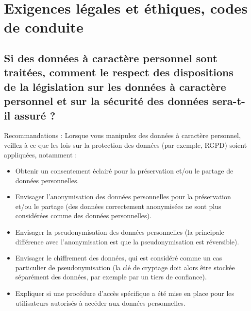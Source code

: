 \documentclass{article}
\begin{document}
\section{Exigences légales et éthiques, codes de conduite}
\subsection{Si des données à caractère personnel sont traitées, comment le respect des dispositions de la législation sur les données à caractère personnel et sur la sécurité des données sera-t-il assuré ?}
Recommandations :
\newline Lorsque vous manipulez des données à caractère personnel, veillez à ce que les lois sur la protection des données (par exemple, RGPD) soient appliquées, notamment :
\begin{itemize}
    \item Obtenir un consentement éclairé pour la préservation et/ou le partage de données personnelles.
    \item Envisager l'anonymisation des données personnelles pour la préservation et/ou le partage (des données correctement anonymisées ne sont plus considérées comme des données personnelles).
    \item Envisager la pseudonymisation des données personnelles (la principale différence avec l'anonymisation est que la pseudonymisation est réversible).
    \item Envisager le chiffrement des données, qui est considéré comme un cas particulier de pseudonymisation (la clé de cryptage doit alors être stockée séparément des données, par exemple par un tiers de confiance).
    \item Expliquer si une procédure d’accès spécifique a été mise en place pour les utilisateurs autorisés à accéder aux données personnelles.
\end{itemize}
\end{document}
